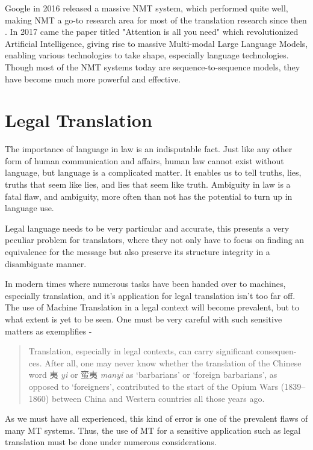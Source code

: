 Google in 2016 released a massive NMT system, which performed quite well, making NMT a go-to research area for most of the translation research since then \cite{wu2016google}. In 2017 came the paper titled "Attention is all you need" \cite{vaswani2017attention} which revolutionized Artificial Intelligence, giving rise to massive Multi-modal Large Language Models, enabling various technologies to take shape, especially language technologies. Though most of the NMT systems today are sequence-to-sequence models, they have become much more powerful and effective.

\section{Legal Translation}

The importance of language in law is an indisputable fact. Just like any other form of human communication and affairs, human law cannot exist without language, but language is a complicated matter. It enables us to tell truths, lies, truths that seem like lies, and lies that seem like truth. Ambiguity in law is a fatal flaw, and ambiguity, more often than not has the potential to turn up in language use.

Legal language needs to be very particular and accurate, this presents a very peculiar problem for translators, where they not only have to focus on finding an equivalence for the message but also preserve its structure integrity in a disambiguate manner.

In modern times where numerous tasks have been handed over to machines, especially translation, and it's application for legal translation isn't too far off. The use of Machine Translation in a legal context will become prevalent, but to what extent is yet to be seen. One must be very careful with such sensitive matters as \cite{deborah2023challenges} exemplifies - 

\begin{quote}
Translation, especially in legal contexts, can carry significant consequen-ces. After all, one may never know whether the translation of the Chinese word 夷 \textit{yi} or 蛮夷 \textit{manyi} as ‘barbarians’ or ‘foreign barbarians’, as opposed to ‘foreigners’, contributed to the start of the Opium Wars (1839–1860) between China and Western countries all those years ago.
\end{quote}

As we must have all experienced, this kind of error is one of the prevalent flaws of many MT systems. Thus, the use of MT for a sensitive application such as legal translation must be done under numerous considerations.


